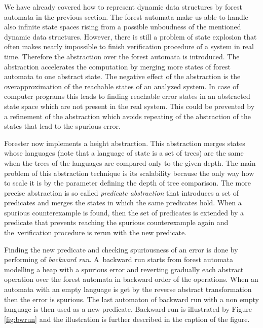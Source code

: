 \documentclass[fleqn,11pt]{ExcelAtFIT} %
\begin{document}
We have already covered how to represent dynamic data structures by forest automata in the previous section.
The forest automata make us able to handle also infinite state spaces
rising from a possible unboudness of the mentioned dynamic data structures.
However, there is still a problem of state explosion that often makes
nearly impossible to finish verification procedure of a system in real time.
Therefore the abstraction over the forest automata is introduced.
The abstraction accelerates the computation by merging more states
of forest automata to one abstract state.
The negative effect of the abstraction is the overapproximation of the reachable
states of an analyzed system.
In case of computer programs this leads to finding reachable error states in
an abstracted state space which are not present in the real system.
This could be prevented by a refinement of the abstraction
which avoids repeating of the abstraction of the states
that lead to the spurious error.

Forester now implements a height abstraction.
This abstraction merges states whose languages (note that a language of state is a set of trees) are the same
when the trees of the languages are compared only to the given depth.
The main problem of this abstraction technique is its scalability because
the only way how to scale it is by the parameter defining the depth of tree comparison.
The more precise abstraction is so called \emph{predicate abstraction} \cite{artmc} that introduces
a set of predicates and merges the states in which the same predicates hold.
When a spurious counterexample is found, then the set of predicates is extended by
a predicate that prevents reaching the spurious counterexample again
and the~verification procedure is rerun with the new predicate.

Finding the new predicate and checking spuriousness of an error is done by performing of \emph{backward run}.
A~backward run starts from forest automata modelling a heap with a spurious error and
reverting gradually each abstract operation over the forest automata
in backward order of the operations.
When an automata with an empty language is get by the reverse abstract transformation then the error is spurious.
The last automaton of backward run with a non empty language is then used as a new predicate.
Backward run is illustrated by Figure \ref{fig:bwrun} and the illustration
is further described in the caption of the figure.
\end{document}
